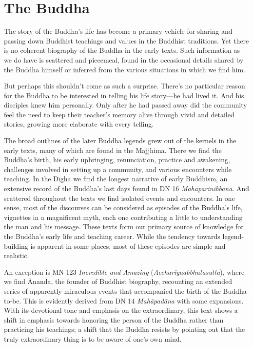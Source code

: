 \documentclass[12pt,openany]{book}%
\begin{document}
\section*{The Buddha}

The story of the Buddha’s life has become a primary vehicle for sharing and passing down Buddhist teachings and values in the Buddhist traditions. Yet there is no coherent biography of the Buddha in the early texts. Such information as we do have is scattered and piecemeal, found in the occasional details shared by the Buddha himself or inferred from the various situations in which we find him.

But perhaps this shouldn’t come as such a surprise. There’s no particular reason for the Buddha to be interested in telling his life story—he had lived it. And his disciples knew him personally. Only after he had passed away did the community feel the need to keep their teacher’s memory alive through vivid and detailed stories, growing more elaborate with every telling.

The broad outlines of the later Buddha legends grew out of the kernels in the early texts, many of which are found in the Majjhima. There we find the Buddha’s birth, his early upbringing, renunciation, practice and awakening, challenges involved in setting up a community, and various encounters while teaching. In the \textsanskrit{Dīgha} we find the longest narrative of early Buddhism, an extensive record of the Buddha’s last days found in DN 16 \textit{\textsanskrit{Mahāparinibbāna}}. And scattered throughout the texts we find isolated events and encounters. In one sense, most of the discourses can be considered as episodes of the Buddha’s life, vignettes in a magnificent myth, each one contributing a little to understanding the man and his message. These texts form our primary source of knowledge for the Buddha’s early life and teaching career. While the tendency towards legend-building is apparent in some places, most of these episodes are simple and realistic.

An exception is MN 123 \textit{Incredible and Amazing} (\textit{Acchariyaabbhutasutta}), where we find Ānanda, the founder of Buddhist biography, recounting an extended series of apparently miraculous events that accompanied the birth of the Buddha-to-be. This is evidently derived from DN 14 \textit{\textsanskrit{Mahāpadāna}} with some expansions. With its devotional tone and emphasis on the extraordinary, this text shows a shift in emphasis towards honoring the person of the Buddha rather than practicing his teachings; a shift that the Buddha resists by pointing out that the truly extraordinary thing is to be aware of one’s own mind.
\end{document}
